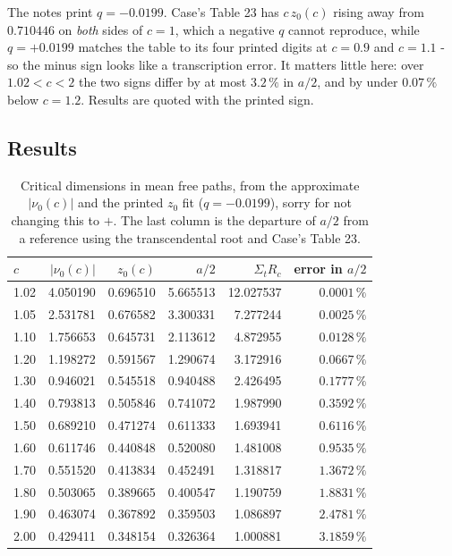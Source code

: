 \documentclass[11pt]{article}
\begin{document}
\begin{notebox}
The notes print $q = -0.0199$. Case's Table 23 has $c\,z_0(c)$ rising away from $0.710446$ on
\emph{both} sides of $c = 1$, which a negative $q$ cannot reproduce, while $q = +0.0199$ matches
the table to its four printed digits at $c = 0.9$ and $c = 1.1$ - so the minus sign looks like
a transcription error. It matters little here: over $1.02 < c < 2$ the two signs differ by at
most $3.2\,\%$ in $a/2$, and by under $0.07\,\%$ below $c = 1.2$. Results are quoted with the
printed sign.
\end{notebox}

\subsection*{Results}
\begin{table}[hbt!]
    \centering
    \begin{tabular}{lrrrrr}
        \toprule
        $c$ & $|\nu_0(c)|$ & $z_0(c)$ & $a/2$ & $\Sigma_t R_c$ & error in $a/2$ \\
        \midrule
        1.02 & 4.050190 & 0.696510 & 5.665513 & 12.027537 & $0.0001\,\%$ \\
        1.05 & 2.531781 & 0.676582 & 3.300331 & 7.277244 & $0.0025\,\%$ \\
        1.10 & 1.756653 & 0.645731 & 2.113612 & 4.872955 & $0.0128\,\%$ \\
        1.20 & 1.198272 & 0.591567 & 1.290674 & 3.172916 & $0.0667\,\%$ \\
        1.30 & 0.946021 & 0.545518 & 0.940488 & 2.426495 & $0.1777\,\%$ \\
        1.40 & 0.793813 & 0.505846 & 0.741072 & 1.987990 & $0.3592\,\%$ \\
        1.50 & 0.689210 & 0.471274 & 0.611333 & 1.693941 & $0.6116\,\%$ \\
        1.60 & 0.611746 & 0.440848 & 0.520080 & 1.481008 & $0.9535\,\%$ \\
        1.70 & 0.551520 & 0.413834 & 0.452491 & 1.318817 & $1.3672\,\%$ \\
        1.80 & 0.503065 & 0.389665 & 0.400547 & 1.190759 & $1.8831\,\%$ \\
        1.90 & 0.463074 & 0.367892 & 0.359503 & 1.086897 & $2.4781\,\%$ \\
        2.00 & 0.429411 & 0.348154 & 0.326364 & 1.000881 & $3.1859\,\%$ \\
        \bottomrule
    \end{tabular}
    \caption{Critical dimensions in mean free paths, from the approximate $|\nu_0(c)|$ and the printed $z_0$ fit ($q = -0.0199$), sorry for not changing this to $+$. The last column is the departure of $a/2$ from a reference using the transcendental root and Case's Table 23.}
    \label{tab:q3}
\end{table}
\end{document}
